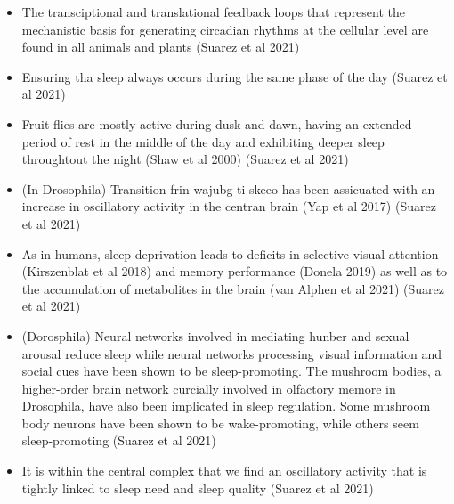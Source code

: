 \documentclass[11pt]{article}
\begin{document}
\begin{itemize}
    \item The transciptional and translational feedback loops that represent the
    mechanistic basis for generating circadian rhythms at the cellular level
    are found in all animals and plants \parencite{suarez-grimaltNeuralArchitectureSleep2021}
    (Suarez et al 2021)

    \item Ensuring tha sleep always occurs during the same phase of the day \parencite{suarez-grimaltNeuralArchitectureSleep2021}
    (Suarez et al 2021)

    \item Fruit flies are mostly active during dusk and dawn, having an extended period
    of rest in the middle of the day and exhibiting deeper sleep throughtout
    the night (Shaw et al 2000) \parencite{suarez-grimaltNeuralArchitectureSleep2021}
    (Suarez et al 2021)

    \item (In Drosophila) Transition frin wajubg ti skeeo has been assicuated with an increase
    in oscillatory activity in the centran brain (Yap et al 2017) \parencite{suarez-grimaltNeuralArchitectureSleep2021}
    (Suarez et al 2021)

    \item As in humans, sleep deprivation leads to deficits in selective visual attention (Kirszenblat et al 2018)
    and memory performance (Donela 2019) as well as to the accumulation of metabolites in the brain
    (van Alphen et al 2021) \parencite{suarez-grimaltNeuralArchitectureSleep2021}
    (Suarez et al 2021)

    \item (Dorosphila) Neural networks involved in mediating hunber and sexual arousal reduce
    sleep while neural networks processing visual information and social cues have
    been shown to be sleep-promoting. The mushroom bodies, a higher-order brain
    network curcially involved in olfactory memore in Drosophila, have
    also been implicated in sleep regulation. Some mushroom body neurons have been
    shown to be wake-promoting, while others seem sleep-promoting \parencite{suarez-grimaltNeuralArchitectureSleep2021}
    (Suarez et al 2021)

    \item It is within the central complex that we find an oscillatory activity that is
    tightly linked to sleep need and sleep quality \parencite{suarez-grimaltNeuralArchitectureSleep2021,raccugliaNetworkSpecificSynchronizationElectrical2019}
    (Suarez et al 2021)


\end{itemize}
\end{document}
